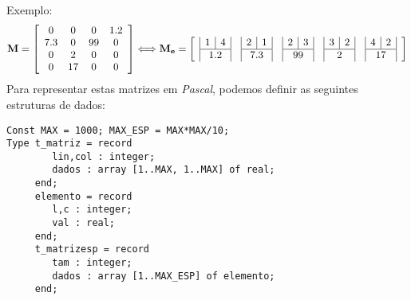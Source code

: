 \begin{enumerate}
Exemplo:
\begin{displaymath}
    \mathbf{M} = \left[ \begin{array}{cccc}
                         0 & 0 & 0 & 1.2 \\
                         7.3 & 0 & 99 & 0 \\
                         0 & 2 & 0 & 0 \\
                         0 & 17 & 0 & 0
                        \end{array} \right] \Longleftrightarrow   
    \mathbf{M_e} = \left[ \begin{array}{ccccc}
                         \begin{array}{|c|c|}
                                1 & 4 \\ \hline \multicolumn{2}{|c|}{1.2}
                               \end{array} &
                         \begin{array}{|c|c|}
                                2 & 1 \\ \hline \multicolumn{2}{|c|}{7.3}
                               \end{array} &
                         \begin{array}{|c|c|}
                                2 & 3 \\ \hline \multicolumn{2}{|c|}{99}
                               \end{array} &
                         \begin{array}{|c|c|}
                                3 & 2 \\ \hline \multicolumn{2}{|c|}{2}
                               \end{array} &
                         \begin{array}{|c|c|}
                                4 & 2 \\ \hline \multicolumn{2}{|c|}{17}
                               \end{array}
                    \end{array} \right]
\end{displaymath}
Para representar estas matrizes em \emph{Pascal}, podemos definir as
seguintes estruturas de dados:
\begin{lstlisting}
Const MAX = 1000; MAX_ESP = MAX*MAX/10;
Type t_matriz = record
        lin,col : integer;
        dados : array [1..MAX, 1..MAX] of real;
     end;
     elemento = record
        l,c : integer;
        val : real;
     end;
     t_matrizesp = record
        tam : integer;
        dados : array [1..MAX_ESP] of elemento;
     end;
\end{lstlisting}


\end{enumerate}
